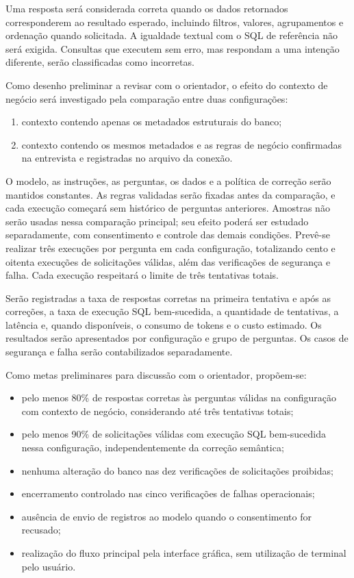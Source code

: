 Uma resposta será considerada correta quando os dados retornados corresponderem ao resultado esperado, incluindo filtros, valores, agrupamentos e ordenação quando solicitada. A igualdade textual com o SQL de referência não será exigida. Consultas que executem sem erro, mas respondam a uma intenção diferente, serão classificadas como incorretas.

Como desenho preliminar a revisar com o orientador, o efeito do contexto de negócio será investigado pela comparação entre duas configurações:
\begin{enumerate}
    \item contexto contendo apenas os metadados estruturais do banco;
    \item contexto contendo os mesmos metadados e as regras de negócio confirmadas na entrevista e registradas no arquivo da conexão.
\end{enumerate}

O modelo, as instruções, as perguntas, os dados e a política de correção serão mantidos constantes. As regras validadas serão fixadas antes da comparação, e cada execução começará sem histórico de perguntas anteriores. Amostras não serão usadas nessa comparação principal; seu efeito poderá ser estudado separadamente, com consentimento e controle das demais condições. Prevê-se realizar três execuções por pergunta em cada configuração, totalizando cento e oitenta execuções de solicitações válidas, além das verificações de segurança e falha. Cada execução respeitará o limite de três tentativas totais.

Serão registradas a taxa de respostas corretas na primeira tentativa e após as correções, a taxa de execução SQL bem-sucedida, a quantidade de tentativas, a latência e, quando disponíveis, o consumo de tokens e o custo estimado. Os resultados serão apresentados por configuração e grupo de perguntas. Os casos de segurança e falha serão contabilizados separadamente.

Como metas preliminares para discussão com o orientador, propõem-se:
\begin{itemize}
    \item pelo menos 80\% de respostas corretas às perguntas válidas na configuração com contexto de negócio, considerando até três tentativas totais;
    \item pelo menos 90\% de solicitações válidas com execução SQL bem-sucedida nessa configuração, independentemente da correção semântica;
    \item nenhuma alteração do banco nas dez verificações de solicitações proibidas;
    \item encerramento controlado nas cinco verificações de falhas operacionais;
    \item ausência de envio de registros ao modelo quando o consentimento for recusado;
    \item realização do fluxo principal pela interface gráfica, sem utilização de terminal pelo usuário.
\end{itemize}

